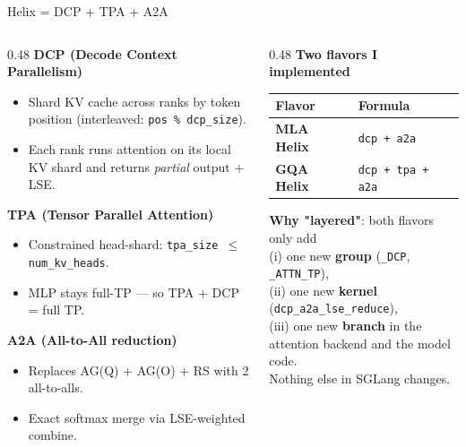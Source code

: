 \documentclass[aspectratio=169,10pt]{beamer}
\begin{document}
\begin{frame}{Helix = DCP + TPA + A2A}
  \footnotesize
  \begin{columns}[T,onlytextwidth]
    \begin{column}{0.48\textwidth}
      \textbf{DCP (Decode Context Parallelism)}
      \begin{itemize}\scriptsize
        \item Shard KV cache across ranks by token position (interleaved: \texttt{pos \% dcp\_size}).
        \item Each rank runs attention on its local KV shard and returns \emph{partial} output + LSE.
      \end{itemize}
      \vspace{0.2cm}
      \textbf{TPA (Tensor Parallel Attention)}
      \begin{itemize}\scriptsize
        \item Constrained head-shard: \texttt{tpa\_size $\le$ num\_kv\_heads}.
        \item MLP stays full-TP --- so TPA + DCP = full TP.
      \end{itemize}
      \vspace{0.2cm}
      \textbf{A2A (All-to-All reduction)}
      \begin{itemize}\scriptsize
        \item Replaces AG(Q) + AG(O) + RS with 2 all-to-alls.
        \item Exact softmax merge via LSE-weighted combine.
      \end{itemize}
    \end{column}
    \begin{column}{0.48\textwidth}
      \textbf{Two flavors I implemented}
      \begin{center}\scriptsize
      \begin{tabular}{l l}
        \toprule
        Flavor & Formula \\
        \midrule
        \textbf{MLA Helix}  & \texttt{dcp + a2a}        \\
        \textbf{GQA Helix}  & \texttt{dcp + tpa + a2a}  \\
        \bottomrule
      \end{tabular}
      \end{center}
      \vspace{0.3cm}
      \textbf{Why "layered"}: both flavors only add\\
      (i) one new \textcolor{slblue}{\textbf{group}} (\texttt{\_DCP}, \texttt{\_ATTN\_TP}),\\
      (ii) one new \textcolor{slred}{\textbf{kernel}} (\texttt{dcp\_a2a\_lse\_reduce}),\\
      (iii) one new \textcolor{slgreen}{\textbf{branch}} in the attention backend and the model code.\\[0.2cm]
      Nothing else in SGLang changes.
    \end{column}
  \end{columns}
\end{frame}
\end{document}
